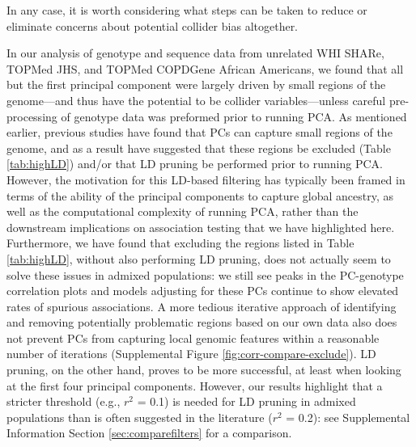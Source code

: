 \documentclass[12pt]{article}
\newcommand{\edit}[1]{{\color{red}{#1}}}
\begin{document}
In any case, it is worth considering what steps can be taken to reduce or eliminate concerns about potential collider bias altogether.

In our analysis of genotype and sequence data from unrelated WHI SHARe, TOPMed JHS, and TOPMed COPDGene African Americans, we found that all but the first principal component were largely driven by small regions of the genome---and thus have the potential to be collider variables---unless careful pre-processing of genotype data was preformed prior to running PCA.
As mentioned earlier, previous studies have found that PCs can capture small regions of the genome, and as a result have suggested that these regions be excluded (Table \ref{tab:highLD}) and/or that LD pruning be performed prior to running PCA.
However, the motivation for this LD-based filtering has typically been framed in terms of the ability of the principal components to capture global ancestry, as well as the computational complexity of running PCA, rather than the downstream implications on association testing that we have highlighted here.
Furthermore, we have found that excluding the regions listed in Table \ref{tab:highLD}, without also performing LD pruning, does not actually seem to solve these issues in admixed populations: we still see peaks in the PC-genotype correlation plots and models adjusting for these PCs continue to show elevated rates of spurious associations.
A more tedious iterative approach of identifying  and removing potentially problematic regions based on our own data also does not prevent PCs from capturing local genomic features within a reasonable number of iterations (Supplemental Figure \ref{fig:corr-compare-exclude}).
LD pruning, on the other hand, proves to be more successful, at least when looking at the first four principal components.
However, our results highlight that a stricter threshold (e.g., $r^2$ = 0.1) is needed for LD pruning in admixed populations than is often suggested in the literature ($r^2$ = 0.2): see Supplemental Information Section \ref{sec:comparefilters} for a comparison.
\end{document}
